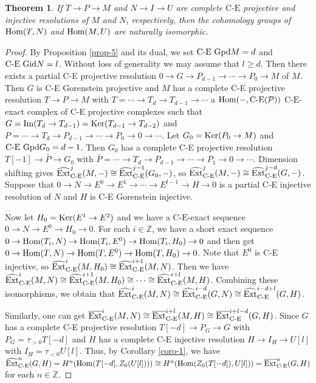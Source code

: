 \documentclass[reqno,12pt]{amsart}
\numberwithin{equation}{section}
\def\Ext{\mbox{\rm Ext}} \def\Tor{\mbox{\rm Tor}}\def\Hom{\mbox{\rm Hom}} \def\dim{\mbox{\rm dim}} \def\Iso{\mbox{\rm Iso}}
\def\Ker{\mbox{\rm Ker}} \def\im{\mbox{\rm Im}} \def\Coker{\mbox{\rm Coker}}\def\mod{\mbox{\rm mod}}
\def\Im{\mbox{\rm Im}} \def\id{\mbox{\rm id}} \def\wid{\mbox{\rm w{\text -}id}} \def\FPid{\mbox{\rm FP{\text -}id}}
\def\dim{\mbox{\rm dim}}\def\Irr{\mbox{\rm Irr}}\def\rad{\mbox{\rm rad}}\def\fg{\mbox{\rm fg}}
\theoremstyle{plain}
\newtheorem{theorem}{\bf Theorem}[section]
\theoremstyle{definition}
\newcommand{\CE}{\mathrm{C}\text{-}\mathrm{E}}
\begin{document}
\begin{theorem}\label{thm-4}
    If $T\to P\to M$ and $N\to I\to U$ are complete $\CE$ projective and injective resolutions of $M$ and $N$, respectively, then the cohomology groups of $\Hom(T,N)$ and $\Hom(M,U)$ are naturally isomorphic.
\end{theorem}
\begin{proof}
    By Proposition \ref{prop-5} and its dual, we set $\text{\rm C-E Gpd}M=d$ and $\text{\rm C-E Gid}N=l$. Without loss of generality we may assume that $l\geq d$. Then there exists a partial C-E projective resolution $0\to G\to P_{d-1}\to \cdots\to P_0\to M$  of $M$. Then $G$ is C-E Gorenstein projective and $M$ has a complete C-E projective resolution $T\to P\to M$ with $T=\cdots\to T_{d}\to T_{d-1}\to \cdots$ a $\Hom(-,\text{C-E}(\mathcal{P}))$ $\CE$-exact complex of C-E projective complexes such that $G=\Im (T_d\to T_{d-1})=\Ker (T_{d-1}\to T_{d-2})$ and $P= \cdots\to T_{d} \to P_{d-1}\to \cdots\to P_0\to 0 \to\cdots$. Let $G_0=\Ker(P_0\to M)$ and $\text{\rm C-E Gpd}G_0=d-1$. Then $G_0$ has a complete C-E projective resolution $T[-1]\to \bar{P}\to G_0$ with $\bar{P}=\cdots\to T_{d} \to P_{d-1}\to \cdots\to P_{1}\to 0 \to\cdots$. Dimension shifting gives $\widehat{\Ext}^j_{\text{C-E}}(M,-)\cong \widehat{\Ext}^{j-1}_{\text{C-E}}(G_0,-)$, so $\widehat{\Ext}^j_{\text{C-E}}(M,-)\cong \widehat{\Ext}^{j-d}_{\text{C-E}}(G,-)$. Suppose that $0\to N\to E^0\to E^1\to \cdots \to E^{l-1}\to H\to 0$ is a partial C-E injective resolution of $N$ and $H$ is C-E Gorenstein injective.

    Now let $H_0=\Ker(E^1\to E^2)$ and we have a $\CE$-exact sequence $0\to N\to E^0\to H_0\to 0$. For each $i\in\mathbb{Z}$, we have a short exact sequence $0\to \Hom(T_i,N)\to \Hom(T_i,E^0)\to \Hom(T_i,H_0)\to 0$ and then get $0\to\Hom(T,N)\to \Hom(T,E^0)\to \Hom(T,H_0)\to 0$. Note that $E^0$ is C-E injective, so $\widehat{\Ext}^i_{\text{C-E}}(M,H_0)\cong \widehat{\Ext}^{i+1}_{\text{C-E}}(M,N)$. Then we have $\widehat{\Ext}^i_{\text{C-E}}(M,N)\cong \widehat{\Ext}^{i+1}_{\text{C-E}}(M,H_0)\cong \cdots\cong\widehat{\Ext}^{i+l}_{\text{C-E}}(M,H)$. Combining these isomorphisms, we obtain that $\widehat{\Ext}^i_{\text{C-E}}(M,N)\cong \widehat{\Ext}^{i-d}_{\text{C-E}}(G,N)\cong \widehat{\Ext}^{i-d+l}_{\text{C-E}}(G,H)$.

    Similarly, one can get $\overline{\Ext}^i_{\text{C-E}}(M,N)\cong \overline{\Ext}^{i+l}_{\text{C-E}}(M,H)\cong \overline{\Ext}^{i+l-d}_{\text{C-E}}(G,H)$. Since $G$ has a complete
    C-E projective resolution $T[-d]\to P_G \to G$ with $P_G=\tau_{>0}T[-d]$ and $H$ has a
    complete C-E injective resolution $H\to I_H\to U[l]$ with $I_H=\tau_{<0}U[l]$. Thus, by
    Corollary \ref{coro-1}, we have $\widehat{\Ext}^{n}_{\text{C-E}}(G,H)=H^n(\Hom(T[-d],Z_0(U[l])))\cong H^n(\Hom(Z_0(T[-d]),U[l]))=\overline{\Ext}^{n}_{\text{C-E}}(G,H)$ for each
    $n\in\mathbb{Z}$.
\end{proof}
\end{document}
